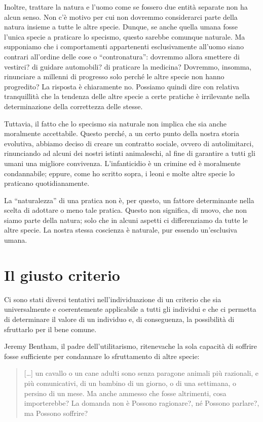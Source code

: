 \documentclass[a4paper,11pt,oneside,article]{memoir}
\begin{document}
Inoltre, trattare la natura e l'uomo come se fossero due entità separate non ha
alcun senso. Non c'è motivo per cui non dovremmo considerarci parte della natura
insieme a tutte le altre specie. Dunque, se anche quella umana fosse l'unica
specie a praticare lo specismo, questo sarebbe comunque naturale. Ma supponiamo
che i comportamenti appartenenti esclusivamente all'uomo siano contrari
all'ordine delle cose o ``contronatura'': dovremmo allora smettere di vestirci? di
guidare automobili? di praticare la medicina? Dovremmo, insomma, rinunciare a
millenni di progresso solo perché le altre specie non hanno progredito? La
risposta è chiaramente no. Possiamo quindi dire con relativa tranquillità che la
tendenza delle altre specie a certe pratiche è irrilevante nella determinazione
della correttezza delle stesse.

Tuttavia, il fatto che lo specismo sia naturale non implica che sia anche
moralmente accettabile. Questo perché, a un certo punto della nostra storia
evolutiva, abbiamo deciso di creare un contratto sociale, ovvero di
autolimitarci, rinunciando ad alcuni dei nostri istinti animaleschi, al fine di
garantire a tutti gli umani una migliore convivenza. L'infanticidio è un crimine
ed è moralmente condannabile; eppure, come ho scritto sopra, i leoni e molte
altre specie lo praticano quotidianamente.

La ``naturalezza'' di una pratica non è, per questo, un fattore determinante
nella scelta di adottare o meno tale pratica. Questo non significa, di nuovo,
che non siamo parte della natura; solo che in alcuni aspetti ci differenziamo da
tutte le altre specie. La nostra stessa coscienza è naturale, pur essendo
un'esclusiva umana.

\chapter{Il giusto criterio}

Ci sono stati diversi tentativi nell'individuazione di un criterio che sia
universalmente e coerentemente applicabile a tutti gli individui e che ci
permetta di determinare il valore di un individuo e, di conseguenza, la
possibilità di sfruttarlo per il bene comune.

Jeremy Bentham, il padre dell'utilitarismo, riteneva\footnotemark[1] che la sola
capacità di soffrire fosse sufficiente per condannare lo sfruttamento di altre
specie:

\begin{quotation}
[…] un cavallo o un cane adulti sono senza paragone animali più razionali, e più
comunicativi, di un bambino di un giorno, o di una settimana, o persino di
un mese. Ma anche ammesso che fosse altrimenti, cosa importerebbe? La
domanda non è Possono ragionare?, né Possono parlare?, ma Possono soffrire?
\end{quotation}
\end{document}
